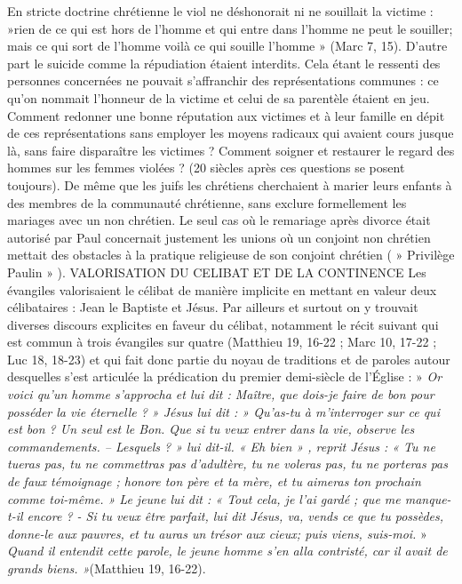  En stricte doctrine chrétienne le viol ne déshonorait ni ne souillait la victime : »rien de ce qui est hors de l'homme et qui entre dans l'homme ne peut le souiller; mais ce qui sort de l'homme voilà ce qui souille l'homme » (Marc 7, 15). D'autre part le suicide comme la répudiation étaient interdits. Cela étant le ressenti des personnes concernées ne pouvait s'affranchir des représentations communes : ce qu'on nommait l'honneur de la victime et celui de sa parentèle étaient en jeu. Comment redonner une bonne réputation aux victimes et à leur famille en dépit de ces représentations sans employer les moyens radicaux qui avaient cours jusque là, sans faire disparaître les victimes ? Comment soigner et restaurer le regard des hommes sur les femmes violées ? (20 siècles après ces questions se posent toujours). 
 De même que les juifs les chrétiens cherchaient à marier leurs enfants à des membres de la communauté chrétienne, sans exclure formellement les mariages avec un non chrétien. Le seul cas où le remariage après divorce était autorisé par Paul concernait justement les unions où un conjoint non chrétien mettait des obstacles à la pratique religieuse de son conjoint chrétien ( » Privilège Paulin » ).
VALORISATION DU CELIBAT ET DE LA CONTINENCE
 Les évangiles valorisaient le célibat de manière implicite en mettant en valeur deux célibataires : Jean le Baptiste et Jésus. Par ailleurs et surtout on y trouvait diverses discours explicites en faveur du célibat, notamment le récit suivant qui est commun à trois évangiles sur quatre (Matthieu 19, 16-22 ; Marc 10, 17-22 ; Luc 18, 18-23) et qui fait donc partie du noyau de traditions et de paroles autour desquelles s'est articulée la prédication du premier demi-siècle de l'Église : » \emph{Or voici qu'un homme s'approcha et lui dit : Maître, que dois-je faire de bon pour posséder la vie éternelle ? » Jésus lui dit : » Qu'as-tu à m'interroger sur ce qui est bon ? Un seul est le Bon. Que si tu veux entrer dans la vie, observe les commandements. – Lesquels ? » lui dit-il. « Eh bien » , reprit Jésus : « Tu ne tueras pas, tu ne commettras pas d'adultère, tu ne voleras pas, tu ne porteras pas de faux témoignage ; honore ton père et ta mère, et tu aimeras ton prochain comme toi-même. » Le jeune lui dit : « Tout cela, je l'ai gardé ; que me manque-t-il encore ? - Si tu veux être parfait, lui dit Jésus, va, vends ce que tu possèdes, donne-le aux pauvres, et tu auras un trésor aux cieux; puis viens, suis-moi.} » \emph{Quand il entendit cette parole, le jeune homme s'en alla contristé, car il avait de grands biens. »}(Matthieu 19, 16-22). 
